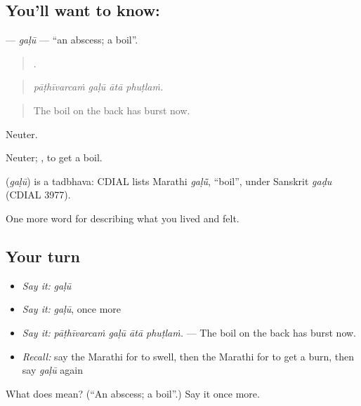 \subsection*{You'll want to know: }
\textbf{} — \emph{gaḷū} — \textquotedblleft{}an abscess; a boil\textquotedblright{}.

\begin{quote}
   .
\end{quote}

\begin{quote}
\emph{pāṭhīvarcaṁ gaḷū ātā phuṭlaṁ.}
\end{quote}

\begin{quote}
The boil on the back has burst now.
\end{quote}

Neuter.

Neuter;  , to get a boil.

\begin{cousinweb}
\textbf{} (\emph{gaḷū}) is a tadbhava: CDIAL lists Marathi \emph{gaḷū̃}, \textquotedblleft{}boil\textquotedblright{}, under Sanskrit \emph{gaḍu} (CDIAL 3977).
\end{cousinweb}

\begin{grammarlens}[title={What you've built}]
One more word for describing what you lived and felt.
\end{grammarlens}

\subsection*{Your turn}
\begin{itemize}
\raggedright
  \item \emph{Say it:} \emph{gaḷū}
  \item \emph{Say it:} \emph{gaḷū}, once more
  \item \emph{Say it:} \emph{pāṭhīvarcaṁ gaḷū ātā phuṭlaṁ.} — The boil on the back has burst now.
  \item \emph{Recall:} say the Marathi for to swell, then the Marathi for to get a burn, then say \emph{gaḷū} again
\end{itemize}

\begin{tcolorbox}[breakable,colback=teal!4,colframe=teal!35!black,title={Before you move on}]
What does  mean? (\textquotedblleft{}An abscess; a boil\textquotedblright{}.) Say it once more.
\end{tcolorbox}
